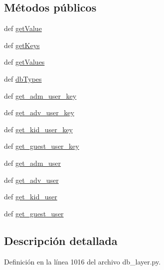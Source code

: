 \subsection*{Métodos públicos}
\begin{DoxyCompactItemize}
\item 
def \hyperlink{classdb__layer_1_1_rol_type_ac219734b1185319c39edd2d1ce8ebdd3}{get\-Value}
\item 
def \hyperlink{classdb__layer_1_1_rol_type_a8c95271c5e2ca02343571ccc433a7ae7}{get\-Keys}
\item 
def \hyperlink{classdb__layer_1_1_rol_type_ac5bb27c22700d45efbcc4c70008bf132}{get\-Values}
\item 
def \hyperlink{classdb__layer_1_1_rol_type_af434fa575abfc7b77fc9a42232cfabce}{db\-Types}
\item 
def \hyperlink{classdb__layer_1_1_rol_type_a44f36ecca8c51e602cff1de6ea476851}{get\-\_\-adm\-\_\-user\-\_\-key}
\item 
def \hyperlink{classdb__layer_1_1_rol_type_a3c8749a4826906bc3f2f92f181161cd0}{get\-\_\-adv\-\_\-user\-\_\-key}
\item 
def \hyperlink{classdb__layer_1_1_rol_type_aa43cd09dad2819bca4e4da02f412d770}{get\-\_\-kid\-\_\-user\-\_\-key}
\item 
def \hyperlink{classdb__layer_1_1_rol_type_a3f6b03ea44b384f6793883881b8510b6}{get\-\_\-guest\-\_\-user\-\_\-key}
\item 
def \hyperlink{classdb__layer_1_1_rol_type_ac819be49bc1ef2a87970cf7e372bef0c}{get\-\_\-adm\-\_\-user}
\item 
def \hyperlink{classdb__layer_1_1_rol_type_a0707e3b825ccab3ea4bb857bfb4cd344}{get\-\_\-adv\-\_\-user}
\item 
def \hyperlink{classdb__layer_1_1_rol_type_ae03637b7a2156ef5524a408944153775}{get\-\_\-kid\-\_\-user}
\item 
def \hyperlink{classdb__layer_1_1_rol_type_a05917cf2e8a756295bd011f48ec4ddc3}{get\-\_\-guest\-\_\-user}
\end{DoxyCompactItemize}


\subsection{Descripción detallada}


Definición en la línea 1016 del archivo db\-\_\-layer.\-py.



